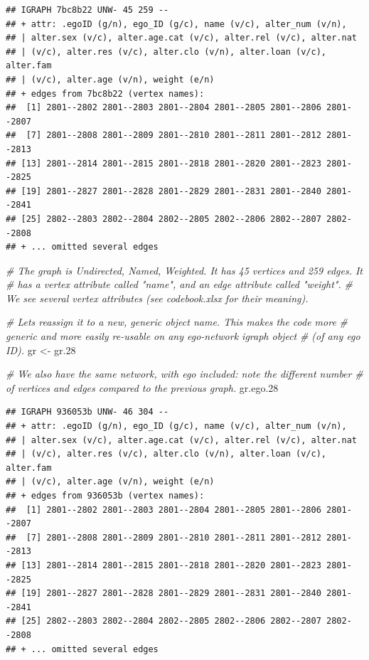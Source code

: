 \documentclass[
]{book}
\newenvironment{Shaded}{\begin{snugshade}}{\end{snugshade}}
\newcommand{\CommentTok}[1]{\textcolor[rgb]{0.56,0.35,0.01}{\textit{#1}}}
\newcommand{\FloatTok}[1]{\textcolor[rgb]{0.00,0.00,0.81}{#1}}
\newcommand{\NormalTok}[1]{#1}
\newcommand{\OtherTok}[1]{\textcolor[rgb]{0.56,0.35,0.01}{#1}}
\begin{document}
\begin{verbatim}
## IGRAPH 7bc8b22 UNW- 45 259 -- 
## + attr: .egoID (g/n), ego_ID (g/c), name (v/c), alter_num (v/n),
## | alter.sex (v/c), alter.age.cat (v/c), alter.rel (v/c), alter.nat
## | (v/c), alter.res (v/c), alter.clo (v/n), alter.loan (v/c), alter.fam
## | (v/c), alter.age (v/n), weight (e/n)
## + edges from 7bc8b22 (vertex names):
##  [1] 2801--2802 2801--2803 2801--2804 2801--2805 2801--2806 2801--2807
##  [7] 2801--2808 2801--2809 2801--2810 2801--2811 2801--2812 2801--2813
## [13] 2801--2814 2801--2815 2801--2818 2801--2820 2801--2823 2801--2825
## [19] 2801--2827 2801--2828 2801--2829 2801--2831 2801--2840 2801--2841
## [25] 2802--2803 2802--2804 2802--2805 2802--2806 2802--2807 2802--2808
## + ... omitted several edges
\end{verbatim}

\begin{Shaded}
\begin{Highlighting}[]
\CommentTok{\# The graph is Undirected, Named, Weighted. It has 45 vertices and 259 edges. It}
\CommentTok{\# has a vertex attribute called "name", and an edge attribute called "weight". }
\CommentTok{\# We see several vertex attributes (see codebook.xlsx for their meaning).}

\CommentTok{\# Let\textquotesingle{}s reassign it to a new, generic object name. This makes the code more }
\CommentTok{\# generic and more easily re{-}usable on any ego{-}network igraph object }
\CommentTok{\# (of any ego ID).}
\NormalTok{gr }\OtherTok{\textless{}{-}}\NormalTok{ gr}\FloatTok{.28}

\CommentTok{\# We also have the same network, with ego included: note the different number}
\CommentTok{\# of vertices and edges compared to the previous graph.}
\NormalTok{gr.ego}\FloatTok{.28}
\end{Highlighting}
\end{Shaded}

\begin{verbatim}
## IGRAPH 936053b UNW- 46 304 -- 
## + attr: .egoID (g/n), ego_ID (g/c), name (v/c), alter_num (v/n),
## | alter.sex (v/c), alter.age.cat (v/c), alter.rel (v/c), alter.nat
## | (v/c), alter.res (v/c), alter.clo (v/n), alter.loan (v/c), alter.fam
## | (v/c), alter.age (v/n), weight (e/n)
## + edges from 936053b (vertex names):
##  [1] 2801--2802 2801--2803 2801--2804 2801--2805 2801--2806 2801--2807
##  [7] 2801--2808 2801--2809 2801--2810 2801--2811 2801--2812 2801--2813
## [13] 2801--2814 2801--2815 2801--2818 2801--2820 2801--2823 2801--2825
## [19] 2801--2827 2801--2828 2801--2829 2801--2831 2801--2840 2801--2841
## [25] 2802--2803 2802--2804 2802--2805 2802--2806 2802--2807 2802--2808
## + ... omitted several edges
\end{verbatim}
\end{document}
